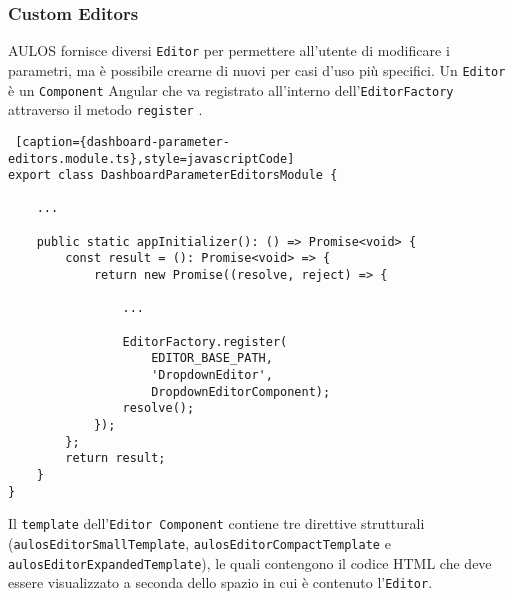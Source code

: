 \subsubsection{Custom Editors}
AULOS fornisce diversi \verb|Editor| per permettere all'utente di modificare i parametri, ma è possibile crearne di nuovi per casi d'uso più specifici. Un \verb|Editor| è un \verb|Component| Angular che va registrato all'interno dell'\verb|EditorFactory| attraverso il metodo \verb|register| .\\
\begin{lstlisting} [caption={dashboard-parameter-editors.module.ts},style=javascriptCode]
export class DashboardParameterEditorsModule {

    ...

    public static appInitializer(): () => Promise<void> {
        const result = (): Promise<void> => {
            return new Promise((resolve, reject) => {
            
                ...
                
                EditorFactory.register(
                    EDITOR_BASE_PATH,
                    'DropdownEditor',
                    DropdownEditorComponent);
                resolve();
            });
        };
        return result;
    }
}
\end{lstlisting}
Il \verb|template| dell'\verb|Editor Component| contiene tre direttive strutturali (\verb|aulosEditorSmallTemplate|, \verb|aulosEditorCompactTemplate| e \verb|aulosEditorExpandedTemplate|), le quali contengono il codice HTML che deve essere visualizzato a seconda dello spazio in cui è contenuto l'\verb|Editor|.
